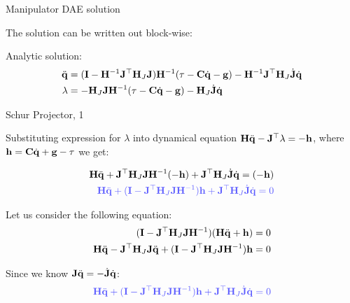 \documentclass{beamer}
\begin{document}
\begin{frame}{Manipulator DAE solution}
	\begin{flushleft}
		
		The solution can be written out block-wise:
		\begin{block}{Analytic solution:}
			\begin{align}
				\ddot{\mathbf{q}}
				&=
				(\mathbf{I}-\mathbf{H}^{-1} \mathbf{J}^\top \mathbf{H}_J \mathbf{J} ) \mathbf{H}^{-1}(\tau - \mathbf{C} \dot{\mathbf{q}} - \mathbf{g}) 
				-
				\mathbf{H}^{-1} \mathbf{J}^\top \mathbf{H}_J \dot{\mathbf{J}} \dot{\mathbf{q}}
				\\
				\lambda
				&=
				-\mathbf{H}_J \mathbf{J} \mathbf{H}^{-1} (\tau - \mathbf{C} \dot{\mathbf{q}} - \mathbf{g})
				-
				\mathbf{H}_J \dot{\mathbf{J}} \dot{\mathbf{q}}
			\end{align}
		\end{block}
		
	\end{flushleft}
\end{frame}




\begin{frame}{Schur Projector, 1}
	\begin{flushleft}
		
		Substituting expression for $\lambda$ into dynamical equation $\mathbf{H}\ddot{\mathbf{q}} - \mathbf{J}^\top\lambda
		=
		-\mathbf{h}$, where $\mathbf{h} =  \mathbf{C} \dot{\mathbf{q}} + \mathbf{g} - \tau$ we get:
		
		\begin{align}
			\bo{H}\ddot{\bo{q}} + 
			\bo{J}\T\bo{H}_J \bo{J} \bo{H}^{-1} (-\bo{h}) +
			\bo{J}\T \bo{H}_J \dot{\bo{J}} \dot{\bo{q}}
			=
			(-\bo{h})
			\\
			\textcolor{myblue}
			{\bo{H}\ddot{\bo{q}} + 
			(\bo{I}-
			\bo{J}\T\bo{H}_J \bo{J} \bo{H}^{-1}) \bo{h} +
			\bo{J}\T \bo{H}_J \dot{\bo{J}} \dot{\bo{q}}
			=
			0}
		\end{align}
		
		Let us consider the following equation:
		\begin{align}
			(\mathbf{I}-
			\mathbf{J}^\top\mathbf{H}_J \mathbf{J} \mathbf{H}^{-1})(\mathbf{H}\ddot{\mathbf{q}}+\mathbf{h})=0
			\\
			\mathbf{H}\ddot{\mathbf{q}} - \mathbf{J}^\top\mathbf{H}_J \mathbf{J} \ddot{\mathbf{q}}
			+
			(\mathbf{I}-
			\mathbf{J}^\top\mathbf{H}_J \mathbf{J} \mathbf{H}^{-1})\mathbf{h} = 0
		\end{align}
		
		Since we know $\mathbf{J} \ddot{\mathbf{q}} = -\dot{\mathbf{J}} \dot{\mathbf{q}}$:
		\begin{align}
			\textcolor{myblue}{
			\bo{H}\ddot{\bo{q}} + (\bo{I}-\bo{J}\T\bo{H}_J \bo{J} \bo{H}^{-1})\bo{h} + \bo{J}\T\bo{H}_J \dot{\bo{J}} \dot{\bo{q}} = 0}
		\end{align}
		
	\end{flushleft}
\end{frame}
\end{document}
